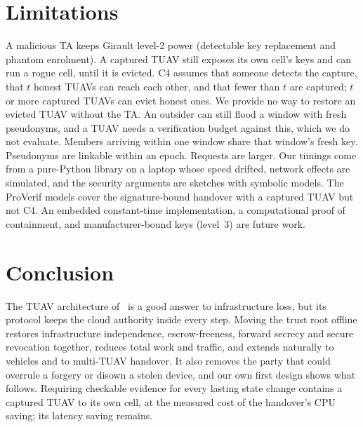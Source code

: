 \documentclass[conference]{IEEEtran}
\begin{document}
\section{Limitations}
A malicious TA keeps Girault level-2 power (detectable key replacement and phantom enrolment). A captured TUAV still exposes its own cell's keys and can run a rogue cell, until it is evicted. C4 assumes that someone detects the capture, that $t$ honest TUAVs can reach each other, and that fewer than $t$ are
captured; $t$ or more captured TUAVs can evict honest ones. We provide no way to restore an evicted TUAV without the TA. An outsider can still flood a window with fresh pseudonyms, and a TUAV needs a
verification budget against this, which we do not evaluate. Members arriving within one window share that window's fresh key. Pseudonyms are linkable within an epoch. Requests are larger. Our timings come from a pure-Python library on a laptop whose speed drifted,
network effects are simulated, and the security arguments are sketches with symbolic models. The ProVerif models cover the signature-bound handover with a captured TUAV but not C4. An embedded constant-time implementation, a
computational proof of containment, and manufacturer-bound keys (level~3) are future work.

\section{Conclusion}
The TUAV architecture of~\cite{base} is a good answer to infrastructure loss, but its protocol keeps the cloud authority inside every step. Moving the trust
root offline restores infrastructure independence, escrow-freeness, forward secrecy and secure revocation together, reduces total work and traffic, and
extends naturally to vehicles and to multi-TUAV handover. It also removes the party that could overrule a forgery or disown a stolen device, and our own first design shows what follows.
Requiring checkable evidence for every lasting state change contains a captured TUAV to its own cell, at the measured cost of the handover's CPU saving; its latency saving remains.
\end{document}
